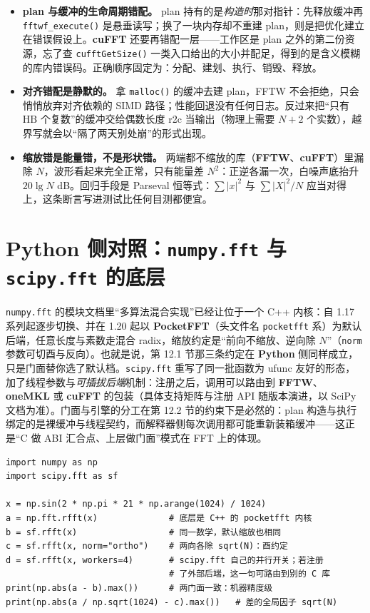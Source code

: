 \documentclass[12pt,a4paper,fontset=fandol]{ctexbook}
\newcommand{\Fn}[1]{\texttt{#1()}}
\newcommand{\Tp}[1]{\texttt{#1}}
\newcommand{\Lib}[1]{\textbf{#1}}
\newcommand{\Lang}[1]{\textsf{\bfseries #1}}
\newcommand{\PY}{\Lang{Python}}
\begin{document}
\begin{warning}[title={对齐、所有权与缩放：FFT 最贵的三个坑}]
\begin{itemize}
\item \textbf{plan 与缓冲的生命周期错配。} plan 持有的是\emph{构造时}那对指针：先释放缓冲再 \Fn{fftwf\_execute} 是悬垂读写；换了一块内存却不重建 plan，则是把优化建立在错误假设上。\Lib{cuFFT} 还要再错配一层——工作区是 plan 之外的第二份资源，忘了查 \Fn{cufftGetSize} 一类入口给出的大小并配足，得到的是含义模糊的库内错误码。正确顺序固定为：分配、建划、执行、销毁、释放。
\item \textbf{对齐错配是静默的。} 拿 \Fn{malloc} 的缓冲去建 plan，FFTW 不会拒绝，只会悄悄放弃对齐依赖的 SIMD 路径；性能回退没有任何日志。反过来把``只有 $\mathrm{HB}$ 个复数''的缓冲交给偶数长度 r2c 当输出（物理上需要 $N+2$ 个实数），越界写就会以``隔了两天别处崩''的形式出现。
\item \textbf{缩放错是能量错，不是形状错。} 两端都不缩放的库（\Lib{FFTW}、\Lib{cuFFT}）里漏除 $N$，波形看起来完全正常，只有能量差 $N^2$：正逆各漏一次，白噪声底抬升 $20\lg N$ dB。回归手段是 Parseval 恒等式：$\sum \lvert x \rvert^2$ 与 $\sum \lvert X \rvert^2 / N$ 应当对得上，这条断言写进测试比任何目测都便宜。
\end{itemize}
\end{warning}

\section{\PY{} 侧对照：\Tp{numpy.fft} 与 \Tp{scipy.fft} 的底层}

\Tp{numpy.fft} 的模块文档里``多算法混合实现''已经让位于一个 C++ 内核：自 1.17 系列起逐步切换、并在 1.20 起以 \Lib{PocketFFT}（头文件名 \Tp{pocketfft} 系）为默认后端，任意长度与素数走混合 radix，缩放约定是``前向不缩放、逆向除 $N$''（\Tp{norm} 参数可切酉与反向）。也就是说，第 12.1 节那三条约定在 \PY{} 侧同样成立，只是门面替你选了默认档。\Tp{scipy.fft} 重写了同一批函数为 ufunc 友好的形态，加了线程参数与\emph{可插拔后端}机制：注册之后，调用可以路由到 \Lib{FFTW}、\Lib{oneMKL} 或 \Lib{cuFFT} 的包装（具体支持矩阵与注册 API 随版本演进，以 SciPy 文档为准）。门面与引擎的分工在第 12.2 节的约束下是必然的：plan 构造与执行绑定的是裸缓冲与线程契约，而解释器侧每次调用都可能重新装箱缓冲——这正是``C 做 ABI 汇合点、上层做门面''模式在 FFT 上的体现。

\begin{lstlisting}[style=pythonstyle,caption={numpy.fft 与 scipy.fft：同一半谱，不同缩放档与后端}]
import numpy as np
import scipy.fft as sf

x = np.sin(2 * np.pi * 21 * np.arange(1024) / 1024)
a = np.fft.rfft(x)              # 底层是 C++ 的 pocketfft 内核
b = sf.rfft(x)                  # 同一数学，默认缩放也相同
c = sf.rfft(x, norm="ortho")    # 两向各除 sqrt(N)：酉约定
d = sf.rfft(x, workers=4)       # scipy.fft 自己的并行开关；若注册
                                # 了外部后端，这一句可路由到别的 C 库
print(np.abs(a - b).max())      # 两门面一致：机器精度级
print(np.abs(a / np.sqrt(1024) - c).max())   # 差的全局因子 sqrt(N)
\end{lstlisting}
\end{document}

